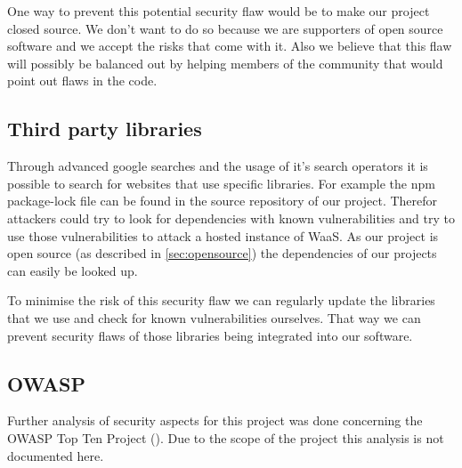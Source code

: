 \documentclass[titlepage, 12pt]{article}
\begin{document}
One way to prevent this potential security flaw would be to make our project closed source. We don't want to do so because we are supporters of open source software and we accept the risks that come with it. Also we believe that this flaw will possibly be balanced out by helping members of the community that would point out flaws in the code.


\subsection{Third party libraries}

Through advanced google searches and the usage of it's search operators it is possible to search for websites that use specific libraries. For example the npm package-lock file can be found in the source repository of our project. Therefor attackers could try to look for dependencies with known vulnerabilities and try to use those vulnerabilities to attack a hosted instance of WaaS. As our project is open source (as described in \ref{sec:opensource}) the dependencies of our projects can easily be looked up.

To minimise the risk of this security flaw we can regularly update the libraries that we use and check for known vulnerabilities ourselves. That way we can prevent security flaws of those libraries being integrated into our software.

\subsection{OWASP}

Further analysis of security aspects for this project was done concerning the OWASP Top Ten Project (\cite{mOWASPTopTen}). Due to the scope of the project this analysis is not documented here.

\pagebreak

\listoftables
\listoffigures

\pagebreak



\end{document}
